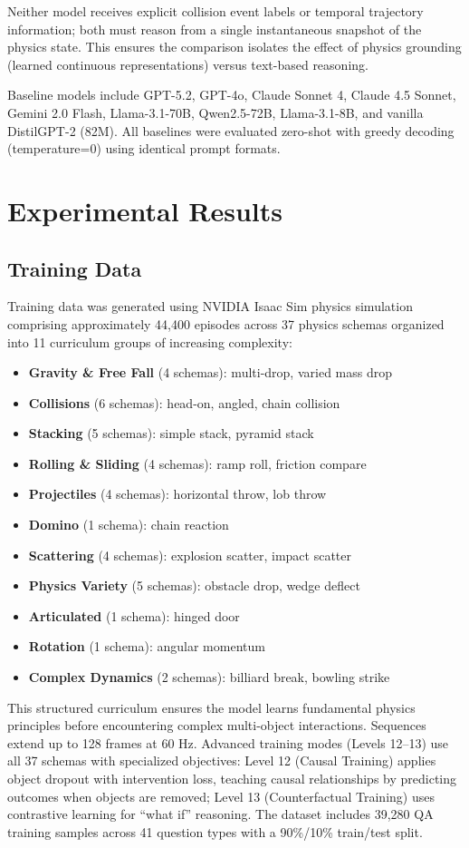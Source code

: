 \documentclass[conference]{IEEEtran}
\theoremstyle{plain}
\theoremstyle{definition}
\theoremstyle{remark}
\begin{document}
Neither model receives explicit collision event labels or temporal trajectory information; both must reason from a single instantaneous snapshot of the physics state. This ensures the comparison isolates the effect of physics grounding (learned continuous representations) versus text-based reasoning.

Baseline models include GPT-5.2, GPT-4o, Claude Sonnet 4, Claude 4.5 Sonnet, Gemini 2.0 Flash, Llama-3.1-70B, Qwen2.5-72B, Llama-3.1-8B, and vanilla DistilGPT-2 (82M). All baselines were evaluated zero-shot with greedy decoding (temperature=0) using identical prompt formats.

\section{Experimental Results}
\label{sec:results}

\subsection{Training Data}
Training data was generated using NVIDIA Isaac Sim physics simulation comprising approximately 44,400 episodes across 37 physics schemas organized into 11 curriculum groups of increasing complexity:
\begin{itemize}[nosep,leftmargin=*]
    \item \textbf{Gravity \& Free Fall} (4 schemas): multi-drop, varied mass drop
    \item \textbf{Collisions} (6 schemas): head-on, angled, chain collision
    \item \textbf{Stacking} (5 schemas): simple stack, pyramid stack
    \item \textbf{Rolling \& Sliding} (4 schemas): ramp roll, friction compare
    \item \textbf{Projectiles} (4 schemas): horizontal throw, lob throw
    \item \textbf{Domino} (1 schema): chain reaction
    \item \textbf{Scattering} (4 schemas): explosion scatter, impact scatter
    \item \textbf{Physics Variety} (5 schemas): obstacle drop, wedge deflect
    \item \textbf{Articulated} (1 schema): hinged door
    \item \textbf{Rotation} (1 schema): angular momentum
    \item \textbf{Complex Dynamics} (2 schemas): billiard break, bowling strike
\end{itemize}
This structured curriculum ensures the model learns fundamental physics principles before encountering complex multi-object interactions. Sequences extend up to 128 frames at 60 Hz. Advanced training modes (Levels 12--13) use all 37 schemas with specialized objectives: Level 12 (Causal Training) applies object dropout with intervention loss, teaching causal relationships by predicting outcomes when objects are removed; Level 13 (Counterfactual Training) uses contrastive learning for ``what if'' reasoning. The dataset includes 39,280 QA training samples across 41 question types with a 90\%/10\% train/test split.
\end{document}
